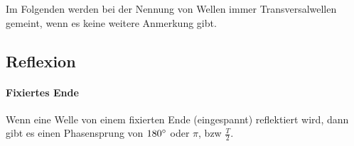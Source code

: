




%
%	





Im Folgenden werden bei der Nennung von \glqq Wellen\grqq{} immer Transversalwellen gemeint, wenn es keine weitere Anmerkung gibt.  



\subsection{Reflexion}  

	\paragraph{Fixiertes Ende}
	
	Wenn eine Welle von einem fixierten Ende (eingespannt) reflektiert wird, dann gibt es einen Phasensprung von $180 \degree$ oder $\pi$, bzw $\frac{T}{2}$.
	

